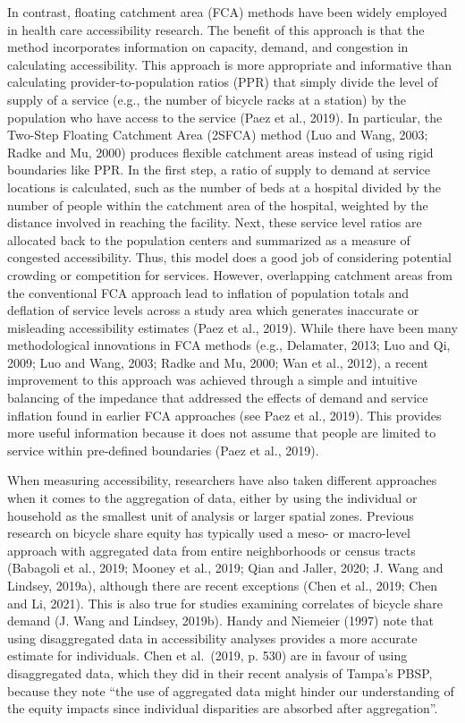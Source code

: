 \documentclass[]{elsarticle} %
\begin{document}
In contrast, floating catchment area (FCA) methods have been widely
employed in health care accessibility research. The benefit of this
approach is that the method incorporates information on capacity,
demand, and congestion in calculating accessibility. This approach is
more appropriate and informative than calculating provider-to-population
ratios (PPR) that simply divide the level of supply of a service (e.g.,
the number of bicycle racks at a station) by the population who have
access to the service (Paez et al., 2019). In particular, the Two-Step
Floating Catchment Area (2SFCA) method (Luo and Wang, 2003; Radke and
Mu, 2000) produces flexible catchment areas instead of using rigid
boundaries like PPR. In the first step, a ratio of supply to demand at
service locations is calculated, such as the number of beds at a
hospital divided by the number of people within the catchment area of
the hospital, weighted by the distance involved in reaching the
facility. Next, these service level ratios are allocated back to the
population centers and summarized as a measure of congested
accessibility. Thus, this model does a good job of considering potential
crowding or competition for services. However, overlapping catchment
areas from the conventional FCA approach lead to inflation of population
totals and deflation of service levels across a study area which
generates inaccurate or misleading accessibility estimates (Paez et al.,
2019). While there have been many methodological innovations in FCA
methods (e.g., Delamater, 2013; Luo and Qi, 2009; Luo and Wang, 2003;
Radke and Mu, 2000; Wan et al., 2012), a recent improvement to this
approach was achieved through a simple and intuitive balancing of the
impedance that addressed the effects of demand and service inflation
found in earlier FCA approaches (see Paez et al., 2019). This provides
more useful information because it does not assume that people are
limited to service within pre-defined boundaries (Paez et al., 2019).

When measuring accessibility, researchers have also taken different
approaches when it comes to the aggregation of data, either by using the
individual or household as the smallest unit of analysis or larger
spatial zones. Previous research on bicycle share equity has typically
used a meso- or macro-level approach with aggregated data from entire
neighborhoods or census tracts (Babagoli et al., 2019; Mooney et al.,
2019; Qian and Jaller, 2020; J. Wang and Lindsey, 2019a), although there
are recent exceptions (Chen et al., 2019; Chen and Li, 2021). This is
also true for studies examining correlates of bicycle share demand (J.
Wang and Lindsey, 2019b). Handy and Niemeier (1997) note that using
disaggregated data in accessibility analyses provides a more accurate
estimate for individuals. Chen et al.~(2019, p. 530) are in favour of
using disaggregated data, which they did in their recent analysis of
Tampa's PBSP, because they note ``the use of aggregated data might
hinder our understanding of the equity impacts since individual
disparities are absorbed after aggregation''.
\end{document}
